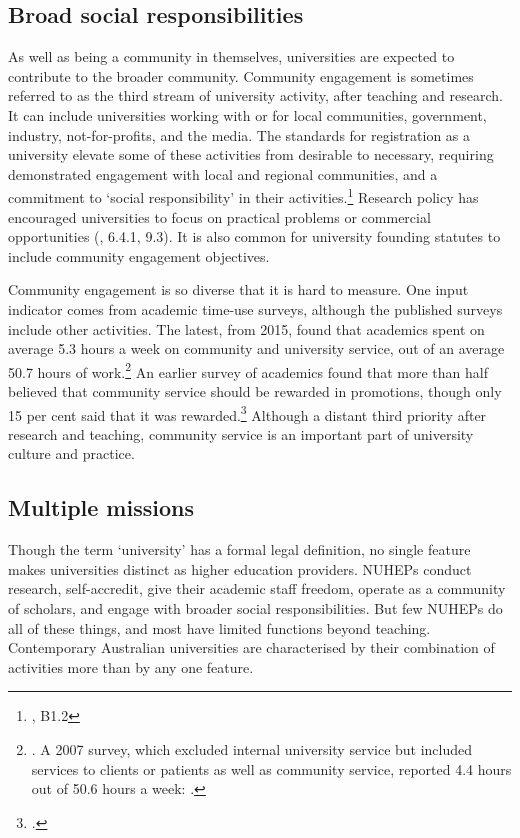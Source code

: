 \documentclass{grattan}
\begin{document}
%
\subsection{Broad social responsibilities }\label{subsec:broad-social-responsibilities}

As well as being a community in themselves, universities are expected to contribute to the broader community. Community engagement is sometimes referred to as the third stream of university activity, after teaching and research. It can include universities working with or for local communities, government, industry, not-for-profits, and the media. The standards for registration as a university elevate some of these activities from desirable to necessary, requiring demonstrated engagement with local and regional communities, and a commitment to `social responsibility' in their activities.\footnote{\textcite[][]{DepartmentofEducationandTraining2015highereducationre}, B1.2} Research policy has encouraged universities to focus on practical problems or commercial opportunities (, 6.4.1, 9.3). It is also common for university founding statutes to include community engagement objectives.

Community engagement is so diverse that it is hard to measure. One input indicator comes from academic time-use surveys, although the published surveys include other activities. The latest, from 2015, found that academics spent on average 5.3 hours a week on community and university service, out of an average 50.7 hours of work.\footnote{\textcite[][]{NTEU2015stateofunisurvey}. A 2007 survey, which excluded internal university service but included services to clients or patients as well as community service, reported 4.4 hours out of 50.6 hours a week: \textcite[][]{Coates2009theattractiveness}.} An earlier survey of academics found that more than half believed that community service should be rewarded in promotions, though only 15 per cent said that it was rewarded.\footcite[][]{Bexley2011theaustralianacad} Although a distant third priority after research and teaching, community service is an important part of university culture and practice.

%
\subsection{Multiple missions}\label{subsec:multiple-missions}

Though the term `university' has a formal legal definition, no single feature makes universities distinct as higher education providers. NUHEPs conduct research, self-accredit, give their academic staff freedom, operate as a community of scholars, and engage with broader social responsibilities. But few NUHEPs do all of these things, and most have limited functions beyond teaching. Contemporary Australian universities are characterised by their combination of activities more than by any one feature.
\end{document}

